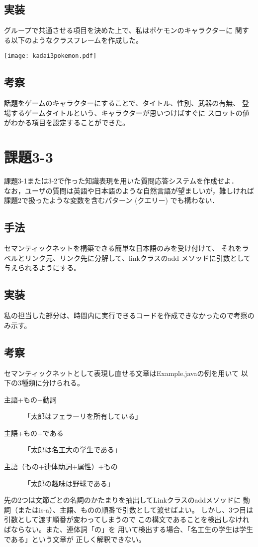\documentclass{jarticle}
\begin{document}
\subsection{実装}
    グループで共通させる項目を決めた上で、私はポケモンのキャラクターに
    関する以下のようなクラスフレームを作成した。
    \begin{center}
        \texttt{[image: kadai3pokemon.pdf]}
    \end{center}
\subsection{考察}
    話題をゲームのキャラクターにすることで、タイトル、性別、武器の有無、
    登場するゲームタイトルという、キャラクターが思いつけばすぐに
    スロットの値がわかる項目を設定することができた。

\section{課題3-3}
\begin{screen}
    課題3-1または3-2で作った知識表現を用いた質問応答システムを作成せよ．
    \\ なお，ユーザの質問は英語や日本語のような自然言語が望ましいが，難しければ課題2で扱ったような変数を含むパターン (クエリー) でも構わない． 
\end{screen}
\subsection{手法}
セマンティックネットを構築できる簡単な日本語のみを受け付けて、
それをラベルとリンク元、リンク先に分解して、linkクラスのadd
メソッドに引数として与えられるようにする。

\subsection{実装}
私の担当した部分は、時間内に実行できるコードを作成できなかったので考察のみ示す。
\subsection{考察}
セマンティックネットとして表現し直せる文章はExample.javaの例を用いて
以下の3種類に分けられる。
\begin{description}
    \item[主語+もの+動詞] 「太郎はフェラーリを所有している」
    \item[主語+もの+である] 「太郎は名工大の学生である」
    \item[主語（もの+連体助詞+属性）+もの] 「太郎の趣味は野球である」  
\end{description}
先の2つは文節ごとの名詞のかたまりを抽出してLinkクラスのaddメソッドに
動詞（またはis-a）、主語、ものの順番で引数として渡せばよい。
しかし、3つ目は引数として渡す順番が変わってしまうので
この構文であることを検出しなければならない。また、連体詞「の」を
用いて検出する場合、「名工生の学生は学生である」という文章が
正しく解釈できない。
\end{document}
